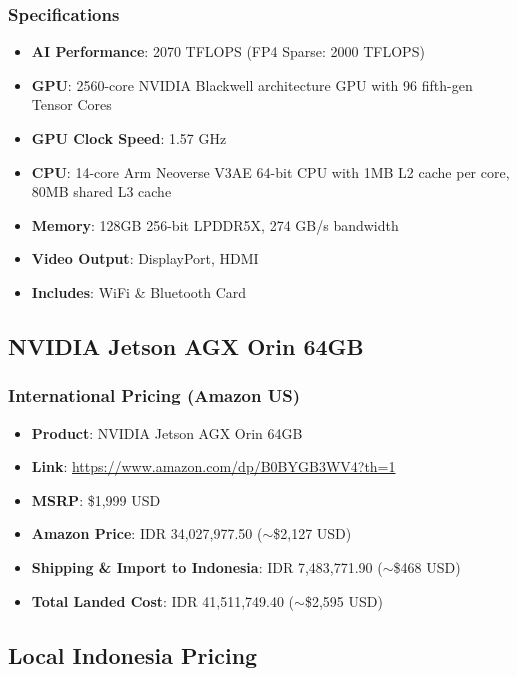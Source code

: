 \documentclass[12pt,a4paper]{article}
\begin{document}
\subsubsection*{Specifications}
\begin{itemize}
    \item \textbf{AI Performance}: 2070 TFLOPS (FP4 Sparse: 2000 TFLOPS)
    \item \textbf{GPU}: 2560-core NVIDIA Blackwell architecture GPU with 96 fifth-gen Tensor Cores
    \item \textbf{GPU Clock Speed}: 1.57 GHz
    \item \textbf{CPU}: 14-core Arm Neoverse V3AE 64-bit CPU with 1MB L2 cache per core, 80MB shared L3 cache
    \item \textbf{Memory}: 128GB 256-bit LPDDR5X, 274 GB/s bandwidth
    \item \textbf{Video Output}: DisplayPort, HDMI
    \item \textbf{Includes}: WiFi \& Bluetooth Card
\end{itemize}

\subsection{NVIDIA Jetson AGX Orin 64GB}

\subsubsection*{International Pricing (Amazon US)}
\begin{itemize}
    \item \textbf{Product}: NVIDIA Jetson AGX Orin 64GB
    \item \textbf{Link}: \url{https://www.amazon.com/dp/B0BYGB3WV4?th=1}
    \item \textbf{MSRP}: \$1,999 USD
    \item \textbf{Amazon Price}: IDR 34,027,977.50 ($\sim$\$2,127 USD)
    \item \textbf{Shipping \& Import to Indonesia}: IDR 7,483,771.90 ($\sim$\$468 USD)
    \item \textbf{Total Landed Cost}: IDR 41,511,749.40 ($\sim$\$2,595 USD)
\end{itemize}

\subsection*{Local Indonesia Pricing}
\end{document}
